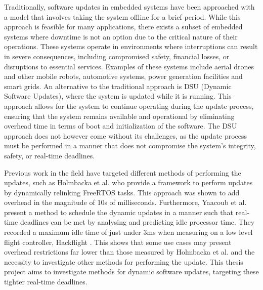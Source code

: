 Traditionally, software updates in embedded systems have been approached with a model that involves taking the system offline for a brief period. While this approach is feasible for many applications, there exists a subset of embedded systems where downtime is not an option due to the critical nature of their operations. These systems operate in environments where interruptions can result in severe consequences, including compromised safety, financial losses, or disruptions to essential services. Examples of these systems include aerial drones and other mobile robots, automotive systems, power generation facilities and smart grids. An alternative to the traditional approach is DSU (Dynamic Software Updates), where the system is updated while it is running. This approach allows for the system to continue operating during the update process, ensuring that the system remains available and operational by eliminating overhead time in terms of boot and initialization of the software. The DSU approach does not however come without its challenges, as the update process must be performed in a manner that does not compromise the system's integrity, safety, or real-time deadlines.

Previous work in the field have targeted different methods of performing the updates, such as Holmbacka et al. \cite{dynUpdateFramework} who provide a framework to perform updates by dynamically relinking FreeRTOS tasks. This approach was shown to add overhead in the magnitude of 10s of milliseconds. Furthermore, Yaacoub et al. \cite{NeRTA} present a method to schedule the dynamic updates in a manner such that real-time deadlines can be met by analysing and predicting idle processor time. They recorded a maximum idle time of just under 3ms when measuring on a low level flight controller, Hackflight \cite{hackflight}. This shows that some use cases may present overhead restrictions far lower than those measured by Holmbacka et al. and the necessity to investigate other methods for performing the update. This thesis project aims to investigate methods for dynamic software updates, targeting these tighter real-time deadlines.  